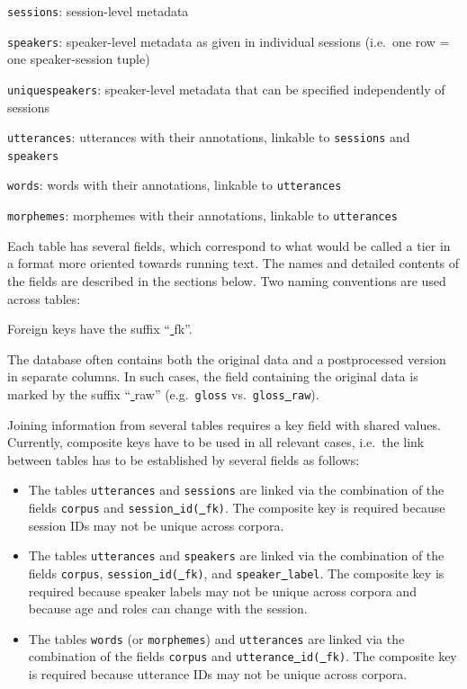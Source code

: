 \documentclass[a4paper, 11pt]{book}
\newcommand{\und}{\underline{{ }}\hspace{0.2mm}}	%
\begin{document}
\begin{itemize*}
	\item \texttt{sessions}: session-level metadata
	\item \texttt{speakers}: speaker-level metadata as given in individual sessions (i.e.\ one row = one speaker-session tuple)
	\item \texttt{uniquespeakers}: speaker-level metadata that can be specified independently of sessions
	\item \texttt{utterances}: utterances with their annotations, linkable to \texttt{sessions} and \texttt{speakers}
	\item \texttt{words}: words with their annotations, linkable to \texttt{utterances}
	\item \texttt{morphemes}: morphemes with their annotations, linkable to \texttt{utterances} %
\end{itemize*}

Each table has several fields, which correspond to what would be called a tier in a format more oriented towards running text. The names and detailed contents of the fields are described in the sections below. Two naming conventions are used across tables: 

\begin{itemize*}
	\item Foreign keys have the suffix “\und fk”. 
	\item The database often contains both the original data and a postprocessed version in separate columns. In such cases, the field containing the original data
		is marked by the suffix “\und raw” (e.g.\ \texttt{gloss} vs.\ \texttt{gloss\und raw}). 
\end{itemize*}

Joining information from several tables requires a key field with shared values. Currently, composite keys have to be used in all relevant cases, i.e.\ the link between tables has to be established by several fields as follows: 

\begin{itemize}
	\item The tables \texttt{utterances} and \texttt{sessions} are linked via the combination of the fields \texttt{corpus} and \texttt{session\und id(\und fk)}.  
		The composite key is required because session IDs may not be unique across corpora. 
	\item The tables \texttt{utterances} and \texttt{speakers} are linked via the combination of the fields \texttt{corpus}, \texttt{session\und id(\und fk)}, 
		and \texttt{speaker\und label}. The composite key is required because speaker labels may not be unique across corpora and because age and roles 
		can change with the session. 
	\item The tables \texttt{words} (or \texttt{morphemes}) and \texttt{utterances} are linked via the combination of the fields \texttt{corpus} and 
		\texttt{utterance\und id(\und fk)}. The composite key is required because utterance IDs may not be unique across corpora. 
\end{itemize}
\end{document}
